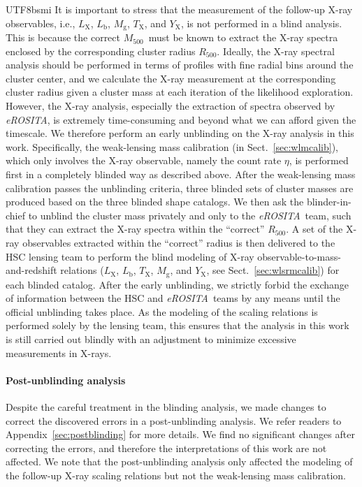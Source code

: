 \documentclass[longauth]{aa}
\newcommand{\Rfiveoo}{\ensuremath{R_{500}}}
\newcommand{\Mfiveoo}{\ensuremath{M_{500}}}
\newcommand{\eROSITA}{\emph{eROSITA}}
\newcommand{\Lx}{\ensuremath{L_{\mathrm{X}}}}
\newcommand{\Lb}{\ensuremath{L_{\mathrm{b}}}}
\newcommand{\Tx}{\ensuremath{T_{\mathrm{X}}}}
\newcommand{\Yx}{\ensuremath{Y_{\mathrm{X}}}}
\newcommand{\Mg}{\ensuremath{M_{\mathrm{g}}}}
\newcommand{\rate}{\ensuremath{\eta}}
\begin{document}
\begin{CJK*}{UTF8}{bsmi}
It is important to stress that the measurement of the follow-up X-ray observables, i.e., \Lx, \Lb, \Mg, \Tx, and \Yx, is not performed in a blind analysis.
This is because the correct \Mfiveoo\ must be known to extract the X-ray spectra enclosed by the corresponding cluster radius \Rfiveoo.
Ideally, the X-ray spectral analysis should be performed in terms of profiles with fine radial bins around the cluster center, and we calculate the X-ray measurement at the corresponding cluster radius given a cluster mass at each iteration of the likelihood exploration.
However, the X-ray analysis, especially the extraction of spectra observed by \eROSITA, is extremely time-consuming and beyond what we can afford given the timescale. 
We therefore perform an early unblinding on the X-ray analysis in this work.
Specifically, the weak-lensing mass calibration (in Sect.~\ref{sec:wlmcalib}), which only involves the X-ray observable, namely the count rate \rate, is performed first in a completely blinded way as described above.
After the weak-lensing mass calibration passes the unblinding criteria, three blinded sets of cluster masses are produced based on the three blinded shape catalogs.
We then ask the blinder-in-chief to unblind the cluster mass privately and only to the \eROSITA\ team, such that they can extract the X-ray spectra within the ``correct'' \Rfiveoo.
A set of the X-ray observables extracted within the ``correct'' radius is then delivered to the HSC lensing team to perform the blind modeling of X-ray observable-to-mass-and-redshift relations (\Lx, \Lb, \Tx, \Mg, and \Yx, see Sect.~\ref{sec:wlsrmcalib}) for each blinded catalog.
After the early unblinding, we strictly forbid the exchange of information between the HSC  and \eROSITA\ teams by any means until the official unblinding takes place.
As the modeling of the scaling relations is performed solely by the lensing team, this ensures that the analysis in this work is still carried out blindly with an adjustment to minimize excessive measurements in X-rays.



\paragraph{Post-unblinding analysis}
Despite the careful treatment in the blinding analysis, we made changes to correct the discovered errors in a post-unblinding analysis. 
We refer readers to Appendix~\ref{sec:postblinding} for more details.
We find no significant changes after correcting the errors, and therefore the interpretations of this work are not affected.
We note that the post-unblinding analysis only affected the modeling of the follow-up X-ray scaling relations but not the weak-lensing mass calibration.




\end{CJK*}
\end{document}
